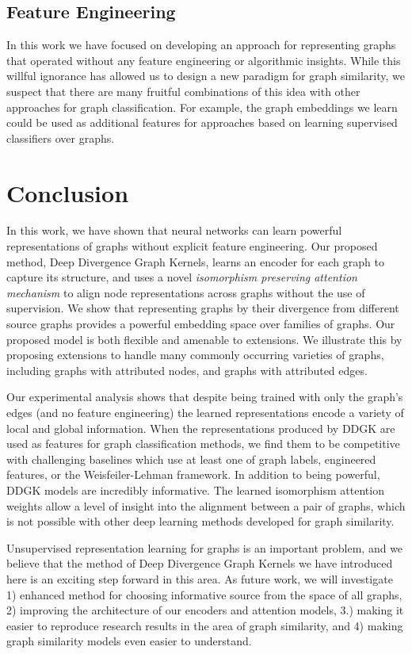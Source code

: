 \documentclass[sigconf]{acmart}
\newcommand{\ours}{\textsc{DDGK}}
\begin{document}
\subsection{Feature Engineering}
In this work we have focused on developing an approach for representing graphs that operated without any feature engineering or algorithmic insights.
While this willful ignorance has allowed us to design a new paradigm for graph similarity, we suspect that there are many fruitful combinations of this idea with other approaches for graph classification.
For example, the graph embeddings we learn could be used as additional features for approaches based on learning supervised classifiers over graphs.


\section{Conclusion}
In this work, we have shown that neural networks can learn powerful representations of graphs without explicit feature engineering.
Our proposed method, Deep Divergence Graph Kernels, learns an encoder for each graph to capture its structure, and uses a novel \textit{isomorphism preserving attention mechanism} to align node representations across graphs without the use of supervision.
We show that representing graphs by their divergence from different source graphs provides a powerful embedding space over families of graphs.
Our proposed model is both flexible and amenable to extensions.
We illustrate this by proposing extensions to handle many commonly occurring varieties of graphs, including graphs with attributed nodes, and graphs with attributed edges.



Our experimental analysis shows that despite being trained with only the graph's edges (and no feature engineering) the learned representations encode a variety of local and global information.
When the representations produced by \ours{} are used as features for  graph classification methods, we find them to be competitive with challenging baselines which use at least one of graph labels, engineered features, or the Weisfeiler-Lehman framework.
In addition to being powerful, \ours{} models are incredibly informative.
The learned isomorphism attention weights allow a level of insight into the alignment between a pair of graphs, which is not possible with other deep learning methods developed for graph similarity.


Unsupervised representation learning for graphs is an important problem, and we believe that the method of Deep Divergence Graph Kernels we have introduced here is an exciting step forward in this area.
As future work, we will investigate 1) enhanced method for choosing informative source from the space of all graphs, 2) improving the architecture of our encoders and attention models, 3.) making it easier to reproduce research results in the area of graph similarity, and 4) making graph similarity models even easier to understand.



\newpage


\end{document}
